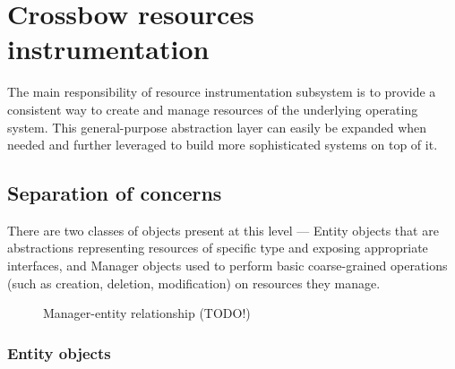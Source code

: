 \documentclass[11pt]{book}
\begin{document}


    \section{Crossbow resources instrumentation}

      The main responsibility of resource instrumentation subsystem is to provide a consistent way to create and manage
      resources of the underlying operating system. This general-purpose abstraction layer can easily be expanded when
      needed and further leveraged to build more sophisticated systems on top of it.
      


      \subsection{Separation of concerns}

        There are two classes of objects present at this level --- Entity objects that are abstractions representing
        resources of specific type and exposing appropriate interfaces, and Manager objects used to perform basic
        coarse-grained operations (such as creation, deletion, modification) on resources they manage.

        \begin{figure}[H]
          \begin{center}
          \end{center}

          \caption{Manager-entity relationship (TODO!)}
        \end{figure}



        \subsubsection{Entity objects}
\end{document}
